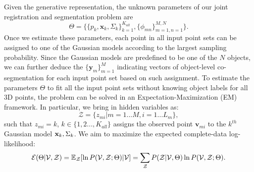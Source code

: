 Given the generative representation, the unknown parameters of our joint registration and segmentation problem are
%
\begin{equation}
\varTheta=\big \{\{p_k,\mathbf{x}_{k},\Sigma_k\}_{k=1}^{K_{all}},\{\phi_{mn}\}_{m=1,n=1}^{M,N}\big\}.
\end{equation}
%
Once we estimate these parameters, each point in all input point sets can be assigned to one of the Gaussian models according to the largest sampling probability.
%
Since the Gaussian models are predefined to be one of the $N$ objects, we can further deduce the $\{\mathbf{y}_m\}_{m=1}^M$ indicating vectors of object-level co-segmentation for each input point set based on such assignment.
%
To estimate the parameters $\Theta$ to fit all the input point sets without knowing object labels for all 3D points, the problem can be solved in an Expectation-Maximization (EM) framework. 
%
In particular, we bring in hidden variables as: 
\begin{equation}
\mathcal{Z}=\{z_{mi}|m=1...M,i=1...L_m\},
\end{equation}
%
such that $z_{mi}=k$, $k \in \{1,2...,K_{all}\}$ assigns the observed point $\mathbf{v}_{mi}$ to the $k^{th}$ Gaussian model $\mathbf{x}_k, \Sigma_k$. 
%
We aim to maximize the expected complete-data log-likelihood:
\begin{equation}
\label{equ:obj0}
\mathcal{E}(\Theta|\mathcal{V},\mathcal{Z})=\mathbb{E}_{\mathcal{Z}}[\ln P(\mathcal{V},\mathcal{Z};\Theta)|\mathcal{V}]={\sum_{\mathcal{Z}}P(\mathcal{Z}|\mathcal{V},\Theta)\ln{P(\mathcal{V},\mathcal{Z};\Theta)}}.
\end{equation}


